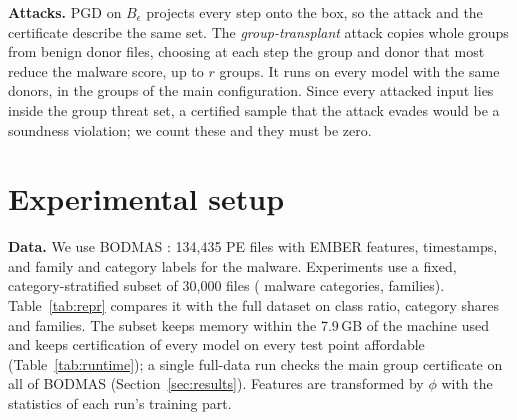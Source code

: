 \documentclass[preprint,12pt,authoryear]{elsarticle}
\begin{document}
\textbf{Attacks.} PGD \citep{madry2018towards} on $B_\epsilon$ projects every step onto the box, so the attack and the certificate describe the same set. The \emph{group-transplant} attack copies whole groups from benign donor files, choosing at each step the group and donor that most reduce the malware score, up to $r$ groups. It runs on every model with the same donors, in the groups of the main configuration. Since every attacked input lies inside the group threat set, a certified sample that the attack evades would be a soundness violation; we count these and they must be zero.

\FloatBarrier
\section{Experimental setup}\label{sec:setup}
\textbf{Data.} We use BODMAS \citep{yang2021bodmas}: 134,435 PE files with EMBER features, timestamps, and family and category labels for the malware. Experiments use a fixed, category-stratified subset of 30,000 files (\ResNCategories{} malware categories, \ResNFamilies{} families). Table~\ref{tab:repr} compares it with the full dataset on class ratio, category shares and families. The subset keeps memory within the 7.9\,GB of the machine used and keeps certification of every model on every test point affordable (Table~\ref{tab:runtime}); a single full-data run checks the main group certificate on all of BODMAS (Section~\ref{sec:results}). Features are transformed by $\phi$ with the statistics of each run's training part.

\begin{table}[!htbp]
\centering\small
\caption{Representativeness of the 30,000-file subset compared with all of BODMAS.}\label{tab:repr}
\resizebox{\textwidth}{!}{}
\end{table}

\begin{table}[!htbp]
\centering\small
\caption{Cost per model on the GTX 1050 Ti (family split, mean over \NSeedsFam{} seeds): training time, certification time per test sample and forward passes per sample.}\label{tab:runtime}
\resizebox{\textwidth}{!}{}
\end{table}
\end{document}
